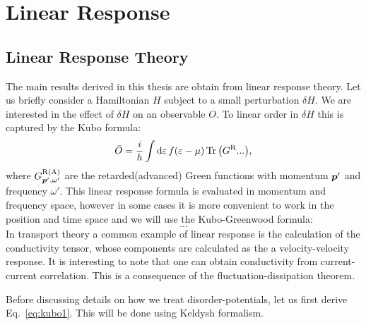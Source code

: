 \chapter{Linear Response}\label{ch:linearesponse}
\section{Linear Response Theory}
The main results derived in this thesis are obtain from linear response theory. Let us briefly consider a Hamiltonian $H$ subject to a small perturbation $\delta H$. We are interested in the effect of $\delta H$ on an observable $O$. To linear order in $\delta H$ this is captured by the Kubo formula:
\begin{equation}
	\bar{O} = \frac{i}{h} \int \mathrm{d}\varepsilon\, f(\varepsilon-\mu) \operatorname{Tr}\big(G^\text{R}...\big),
	\label{eq:kubo1}
\end{equation}
where $G^\text{R(A)}_{\boldsymbol{p}',\omega'}$ are the retarded(advanced) Green functions with momentum $\boldsymbol{p}'$ and frequency $\omega'$. This linear response formula is evaluated in momentum and frequency space, however in some cases it is more convenient to work in the position and time space and we will use the Kubo-Greenwood formula:
\begin{equation}
	...
\end{equation}
In transport theory a common example of linear response is the calculation of the conductivity tensor, whose components are calculated as the a velocity-velocity response. It is interesting to note that one can obtain conductivity from current-current correlation. This is a consequence of the fluctuation-dissipation theorem. 

Before discussing details on how we treat disorder-potentials, let us first derive Eq.~\ref{eq:kubo1}. This will be done using Keldysh formalism.

